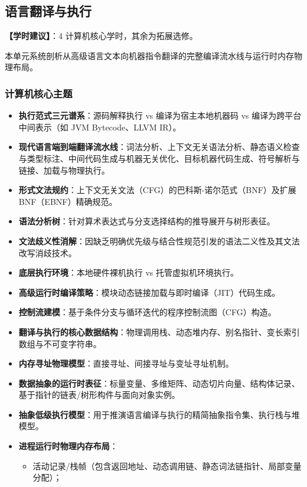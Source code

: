 \subsection{语言翻译与执行}
\textbf{【学时建议】}：4 计算机核心学时，其余为拓展选修。

本单元系统剖析从高级语言文本向机器指令翻译的完整编译流水线与运行时内存物理布局。

\subsubsection{计算机核心主题}
\begin{itemize}
    \item \textbf{执行范式三元谱系}：源码解释执行 vs 编译为宿主本地机器码 vs 编译为跨平台中间表示（如 JVM Bytecode、LLVM IR）。
    \item \textbf{现代语言端到端翻译流水线}：词法分析、上下文无关语法分析、静态语义检查与类型标注、中间代码生成与机器无关优化、目标机器代码生成、符号解析与链接、加载与物理执行。
    \item \textbf{形式文法规约}：上下文无关文法（CFG）的巴科斯-诺尔范式（BNF）及扩展 BNF（EBNF）精确规范。
    \item \textbf{语法分析树}：针对算术表达式与分支选择结构的推导展开与树形表征。
    \item \textbf{文法歧义性消解}：因缺乏明确优先级与结合性规范引发的语法二义性及其文法改写消歧技术。
    \item \textbf{底层执行环境}：本地硬件裸机执行 vs 托管虚拟机环境执行。
    \item \textbf{高级运行时编译策略}：模块动态链接加载与即时编译（JIT）代码生成。
    \item \textbf{控制流建模}：基于条件分支与循环迭代的程序控制流图（CFG）构造。
    \item \textbf{翻译与执行的核心数据结构}：物理调用栈、动态堆内存、别名指针、变长索引数组与不可变字符串。
    \item \textbf{内存寻址物理模型}：直接寻址、间接寻址与变址寻址机制。
    \item \textbf{数据抽象的运行时表征}：标量变量、多维矩阵、动态切片向量、结构体记录、基于指针的链表/树形构件与面向对象实例。
    \item \textbf{抽象低级执行模型}：用于推演语言编译与执行的精简抽象指令集、执行栈与堆模型。
    \item \textbf{进程运行时物理内存布局}：
    \begin{itemize}
        \item 活动记录/栈帧（包含返回地址、动态调用链、静态词法链指针、局部变量分配）；

\end{itemize}
\end{itemize}
